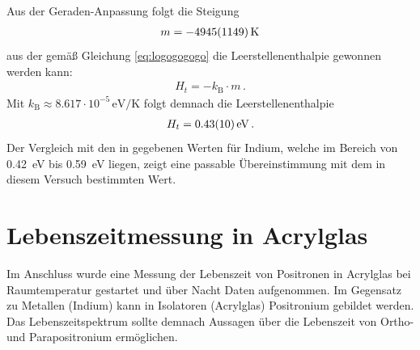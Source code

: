 \documentclass[11pt, a4paper]{article}
\numberwithin{equation}{section}
\begin{document}
Aus der Geraden-Anpassung folgt die Steigung
\begin{align*}
	m = \SI{-4945 +- 1149}{\kelvin}
\end{align*}
aus der gemäß Gleichung \eqref{eq:logogogogo} die Leerstellenenthalpie gewonnen werden kann:
\begin{align*}
	H_t = -k_\mathrm{B} \cdot m \, \text{.}
\end{align*}
Mit $k_\mathrm{B} \approx \num{8.617} \cdot 10^{-5} \, \si{\eV\per\kelvin}$ \cite{codata} folgt demnach die Leerstellenenthalpie
\begin{align*}
	H_t = \SI{0.43 +- 0.10}{\electronvolt} \, \text{.}
\end{align*}
Der Vergleich mit den in \cite{indium} gegebenen Werten für Indium, welche im Bereich von \SI{0.42}{\eV} bis \SI{0.59}{\eV} liegen, zeigt eine passable Übereinstimmung mit dem in diesem Versuch bestimmten Wert.


\section{Lebenszeitmessung in Acrylglas}
Im Anschluss wurde eine Messung der Lebenszeit von Positronen in Acrylglas bei Raumtemperatur gestartet und über Nacht Daten aufgenommen.
Im Gegensatz zu Metallen (Indium) kann in Isolatoren (Acrylglas) Positronium gebildet werden.
Das Lebenszeitspektrum sollte demnach Aussagen über die Lebenszeit von Ortho- und Parapositronium ermöglichen.
\end{document}
